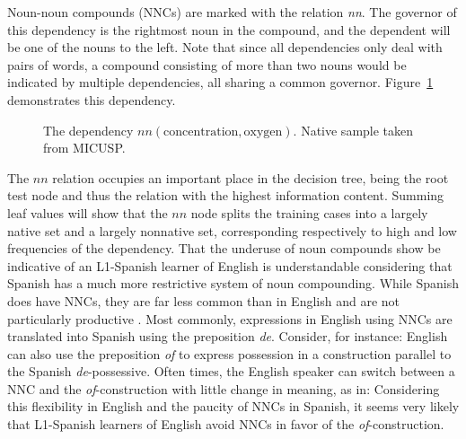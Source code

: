 \documentclass[main.tex]{subfiles}
\begin{document}
Noun-noun compounds (NNCs) are marked with the relation \textit{nn}. The governor of this dependency is the rightmost noun in the compound, and the dependent will be one of the nouns to the left. Note that since all dependencies only deal with pairs of words, a compound consisting of more than two nouns would be indicated by multiple dependencies, all sharing a common governor. Figure~\ref{fig:nn-deps} demonstrates this dependency. 

\begin{figure}[htbp]
\caption{The dependency $nn(\text{concentration}, \text{oxygen})$. Native sample taken from MICUSP.}
\centering
{}
\label{fig:nn-deps}
\end{figure}

The $nn$ relation occupies an important place in the decision tree, being the root test node and thus the relation with the highest information content. Summing leaf values will show that the $nn$ node splits the training cases into a largely native set and a largely nonnative set, corresponding respectively to high and low frequencies of the dependency. That the underuse of noun compounds show be indicative of an L1-Spanish learner of English is understandable considering that Spanish has a much more restrictive system of noun compounding. While Spanish does have NNCs, they are far less common than in English and are not particularly productive \citep{piera:1995}. Most commonly, expressions in English using NNCs are translated into Spanish using the preposition \textit{de}. Consider, for instance:
English can also use the preposition \textit{of} to express possession in a construction parallel to the Spanish \textit{de}-possessive. Often times, the English speaker can switch between a NNC and the \textit{of}-construction with little change in meaning, as in:
Considering this flexibility in English and the paucity of NNCs in Spanish, it seems very likely that L1-Spanish learners of English avoid NNCs in favor of the \textit{of}-construction.
\end{document}
